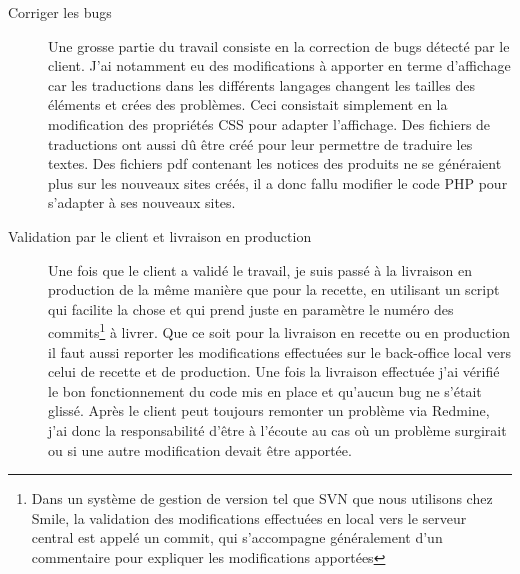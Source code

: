 \documentclass[a4paper,11pt,twoside]{report}
\begin{document}
\begin{description}
\begin{center}
	\label{DDTH_home}
	\end{center}
	\item[Corriger les bugs] Une grosse partie du travail consiste en la correction de bugs détecté par le client. J'ai notamment eu des modifications à apporter en terme d'affichage car les traductions dans les différents langages changent les tailles des éléments et crées des problèmes. Ceci consistait simplement en la modification des propriétés CSS pour adapter l'affichage. Des fichiers de traductions ont aussi dû être créé pour leur permettre de traduire les textes. Des fichiers pdf contenant les notices des produits ne se généraient plus sur les nouveaux sites créés, il a donc fallu modifier le code PHP pour s'adapter à ses nouveaux sites. 
	\item[Validation par le client et livraison en production] Une fois que le client a validé le travail, je suis passé à la livraison en production de la même manière que pour la recette, en utilisant un script qui facilite la chose et qui prend juste en paramètre le numéro des commits\footnote{Dans un système de gestion de version tel que SVN que nous utilisons chez Smile, la validation des modifications effectuées en local vers le serveur central est appelé un commit, qui s'accompagne généralement d'un commentaire pour expliquer les modifications apportées} à livrer. Que ce soit pour la livraison en recette ou en production il faut aussi reporter les modifications effectuées sur le back-office local vers celui de recette et de production. Une fois la livraison effectuée j'ai vérifié le bon fonctionnement du code mis en place et qu'aucun bug ne s'était glissé. Après le client peut toujours remonter un problème via Redmine, j'ai donc la responsabilité d'être à l'écoute au cas où un problème surgirait ou si une autre modification devait être apportée.  
      
      \end{description}
\end{document}
